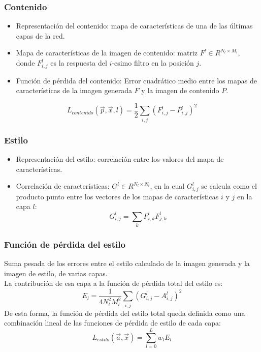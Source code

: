 \documentclass[10pt,center]{beamer}
\begin{document}
\begin{frame}
 \frametitle{Contenido}
  \begin{itemize}
   \item Representación del contenido: mapa de características de una de las últimas capas de la red.
   \item Mapa de características de la imagen de contenido: matriz $F^l \in R^{N_l \times M_l}$, donde $F_{i,j}^l$ es la respuesta del $i$-esimo filtro en la posición $j$.
   \item Función de pérdida del contenido: Error cuadrático medio entre los mapas de características de la imagen generada $F$ y la imagen de contenido $P$.
  \end{itemize}
  \begin{equation}
    L_{contenido}(\overrightarrow{p},\overrightarrow{x}, l) = \frac{1}{2} \sum_{i,j} (F_{i,j}^l - P_{i,j}^l)^2
  \end{equation}
\end{frame}

\begin{frame}
 \frametitle{Estilo}
  \begin{itemize}
    \item Representación del estilo: correlación entre los valores del mapa de características.
    \item Correlación de características: $G^l \in R^{N_l \times N_l}$, en la cual $G_{i,j}^l$ se calcula como el producto punto entre los vectores
      de los mapas de características $i$ y $j$ en la capa $l$:
	\begin{equation}
	  G_{i,j}^l = \sum_{k} F_{i,k}^l F_{j,k}^l
	\end{equation}
  \end{itemize}

\end{frame}

\begin{frame}
  \frametitle{Función de pérdida del estilo}
  Suma pesada de los errores entre el estilo calculado de la imagen generada y la imagen de estilo, de varias capas.\\
    La contribución de esa capa a la función de pérdida total del estilo es:
      \begin{equation}
       E_l = \frac{1}{4 N_l^2 M_l^2} \sum_{i,j} (G_{i,j}^l - A_{i,j}^l)^2
      \end{equation}
      De esta forma, la función de pérdida del estilo total queda definida como una combinación lineal de las funciones de pérdida de estilo de cada capa:
      \begin{equation}
       L_{estilo}(\overrightarrow{a},\overrightarrow{x}) = \sum_{l=0}^{L} w_l E_l
      \end{equation}
\end{frame}
\end{document}
